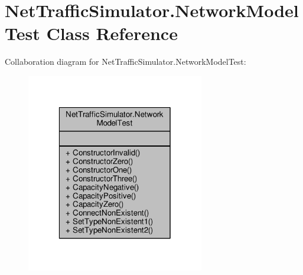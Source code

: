 \hypertarget{classNetTrafficSimulator_1_1NetworkModelTest}{\section{Net\-Traffic\-Simulator.\-Network\-Model\-Test Class Reference}
\label{classNetTrafficSimulator_1_1NetworkModelTest}
}


Collaboration diagram for Net\-Traffic\-Simulator.\-Network\-Model\-Test\-:\nopagebreak
\begin{figure}[H]
\begin{center}
\leavevmode
\includegraphics[width=220pt]{classNetTrafficSimulator_1_1NetworkModelTest__coll__graph}
\end{center}
\end{figure}
